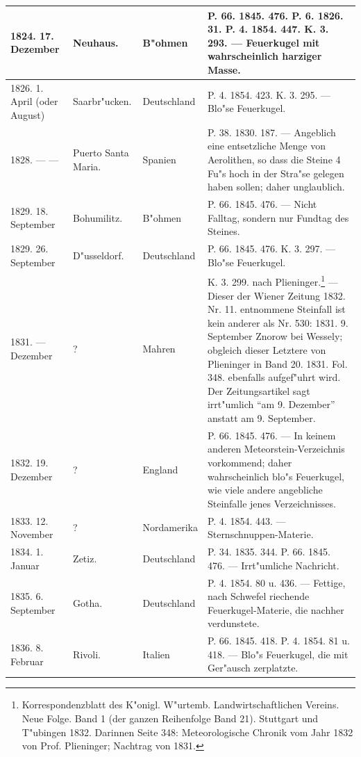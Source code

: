 \documentclass[a4paper, 8pt, oneside, polutonikogreek, german]{article}
\begin{document}
\begin{center}
\begin{longtable}{| p{20mm} | p{25mm} | p{20mm} | p{55mm} |}
        1824. 17. Dezember & Neuhaus. & B"ohmen & P. 66. 1845. 476. P. 6. 1826. 31. P. 4. 1854. 447. K. 3. 293. --- Feuerkugel mit wahrscheinlich harziger Masse. \\ \hline
        1826. 1. April (oder August) & Saarbr"ucken. & Deutschland & P. 4. 1854. 423. K. 3. 295. --- Blo"se Feuerkugel. \\ \hline
        1828. --- --- & Puerto Santa Maria. & Spanien & P. 38. 1830. 187. --- Angeblich eine entsetzliche Menge von Aerolithen, so dass die Steine 4 Fu"s hoch in der Stra"se gelegen haben sollen; daher unglaublich. \\ \hline
        1829. 18. September & Bohumilitz. & B"ohmen & P. 66. 1845. 476. --- Nicht Falltag, sondern nur Fundtag des Steines. \\ \hline
        1829. 26. September & D"usseldorf. & Deutschland & P. 66. 1845. 476. K. 3. 297. --- Blo"se Feuerkugel. \\ \hline
        1831. --- Dezember & ? & Mahren & K. 3. 299. nach Plieninger.\footnote{Korrespondenzblatt des K"onigl. W"urtemb. Landwirtschaftlichen Vereins. Neue Folge. Band 1 (der ganzen Reihenfolge Band 21). Stuttgart und T"ubingen 1832. Darinnen Seite 348: Meteorologische Chronik vom Jahr 1832 von Prof. Plieninger; Nachtrag von 1831.} --- Dieser der Wiener Zeitung 1832. Nr. 11. entnommene Steinfall ist kein anderer als Nr. 530: 1831. 9. September Znorow bei Wessely; obgleich dieser Letztere von Plieninger in Band 20. 1831. Fol. 348. ebenfalls aufgef"uhrt wird. Der Zeitungsartikel sagt irrt"umlich "`am 9. Dezember"' anstatt am 9. September. \\ \hline
        1832. 19. Dezember & ? & England & P. 66. 1845. 476. --- In keinem anderen Meteorstein-Verzeichnis vorkommend; daher wahrscheinlich blo"s Feuerkugel, wie viele andere angebliche Steinfalle jenes Verzeichnisses. \\ \hline
        1833. 12. November & ? & Nordamerika & P. 4. 1854. 443. --- Sternschnuppen-Materie. \\ \hline
        1834. 1. Januar & Zetiz. & Deutschland & P. 34. 1835. 344. P. 66. 1845. 476. --- Irrt"umliche Nachricht. \\ \hline
        1835. 6. September & Gotha. & Deutschland & P. 4. 1854. 80 u. 436. --- Fettige, nach Schwefel riechende Feuerkugel-Materie, die nachher verdunstete. \\ \hline
        1836. 8. Februar & Rivoli. & Italien & P. 66. 1845. 418. P. 4. 1854. 81 u. 418. --- Blo"s Feuerkugel, die mit Ger"ausch zerplatzte. \\ \hline

\end{longtable}
\end{center}
\end{document}

